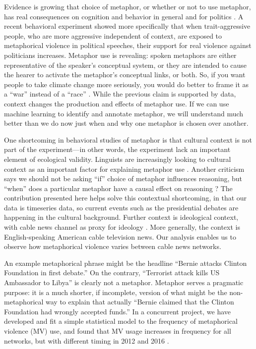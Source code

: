 \documentclass[11pt,letterpaper]{amsart}
\begin{document}
Evidence is growing that choice of metaphor, or whether or not to use
metaphor, has real consequences on cognition and behavior in general
\cite{Lakoff2014} and for politics \cite{Matlock2012}. 
A recent behavioral experiment showed more specifically that when
trait-aggressive people, who are more aggressive independent of context,
are exposed to metaphorical violence in political speeches, their support for
real violence against politicians increases.
Metaphor use is revealing:
spoken metaphors are either representative of the speaker's conceptual
system, or they are intended to cause the hearer to activate the metaphor's
conceptual links, or both.
So, if you want people to take climate change more seriously, you would
do better to frame it as a ``war'' instead of a ``race'' \cite{Flusberg2017}.
While the previous claim is supported by data, context changes the production
and effects of metaphor use. If we can use machine learning to identify and
annotate metaphor, we will understand much better than we do now just when
and why one metaphor is chosen over another.

One shortcoming in behavioral studies of metaphor is that
cultural context is not part of the experiment---in other words, the experiment
lack an important element of ecological validity. Linguists 
are increasingly looking to cultural context as
an important factor for explaining metaphor use \cite{Kovecses2010}. 
Another criticism
says we should not be asking ``if'' choice of metaphor influences
reasoning, but ``when'' does a particular metaphor have a causal effect
on reasoning \cite{Steen2014}? The contribution presented here helps solve
this contextual shortcoming, in that our data is timeseries data, so
current events such as the presidential debates are happening in the
cultural background. Further context is ideological context, with cable
news channel as proxy for ideology \cite{Pew2014, King2017}. More
generally, the context is English-speaking American cable television news.
Our analysis enables us to observe how metaphorical violence varies between 
cable news networks.

An example metaphorical phrase might be the headline ``Bernie attacks
Clinton Foundation in first debate.'' On the contrary, ``Terrorist attack kills
US Ambassador to Libya'' is clearly not a metaphor. Metaphor serves a pragmatic
purpose: it is a much shorter, if incomplete, version of what might be
the non-metaphorical way to explain that actually ``Bernie claimed that
the Clinton Foundation had wrongly accepted funds.'' In a concurrent
project, we have developed and fit a simple statistical model to the
frequency of metaphorical violence (MV) use, and found that MV usage
increases in frequency for all networks, but with different timing in
2012 and 2016 \cite{Turner2018a}.
\end{document}
